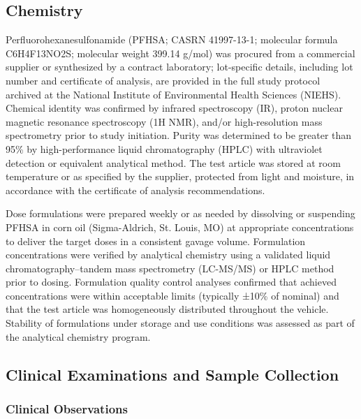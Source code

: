 \subsection{Chemistry}

Perfluorohexanesulfonamide (PFHSA; CASRN 41997-13-1; molecular formula C6H4F13NO2S; molecular weight 399.14 g/mol) was procured from a commercial supplier or synthesized by a contract laboratory; lot-specific details, including lot number and certificate of analysis, are provided in the full study protocol archived at the National Institute of Environmental Health Sciences (NIEHS). Chemical identity was confirmed by infrared spectroscopy (IR), proton nuclear magnetic resonance spectroscopy (1H NMR), and/or high-resolution mass spectrometry prior to study initiation. Purity was determined to be greater than 95\% by high-performance liquid chromatography (HPLC) with ultraviolet detection or equivalent analytical method. The test article was stored at room temperature or as specified by the supplier, protected from light and moisture, in accordance with the certificate of analysis recommendations.

Dose formulations were prepared weekly or as needed by dissolving or suspending PFHSA in corn oil (Sigma-Aldrich, St. Louis, MO) at appropriate concentrations to deliver the target doses in a consistent gavage volume. Formulation concentrations were verified by analytical chemistry using a validated liquid chromatography–tandem mass spectrometry (LC-MS/MS) or HPLC method prior to dosing. Formulation quality control analyses confirmed that achieved concentrations were within acceptable limits (typically ±10\% of nominal) and that the test article was homogeneously distributed throughout the vehicle. Stability of formulations under storage and use conditions was assessed as part of the analytical chemistry program.

\subsection{Clinical Examinations and Sample Collection}

\subsubsection{Clinical Observations}

